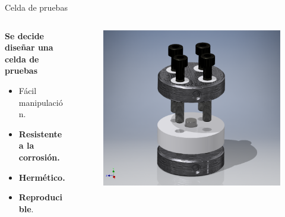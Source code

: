 \documentclass[aspectratio=169]{beamer}
\begin{document}
	\begin{frame}{Celda de pruebas}
		\begin{columns}
			\begin{column}{0.5\textwidth}
				\textbf{Se decide diseñar una celda de pruebas}
				\begin{itemize}[<+->]
					\item Fácil manipulación.
					\item \textbf{Resistente a la corrosión.}
					\item \textbf{Hermético.}
					\item  \textbf{Reproducible}.
				\end{itemize}
			\end{column}
			\begin{column}{0.5\textwidth}
				\begin{figure}
					\includegraphics[width=\textwidth]{cell4.png}
				\end{figure}
			\end{column}
		\end{columns}
	\end{frame}
\end{document}
